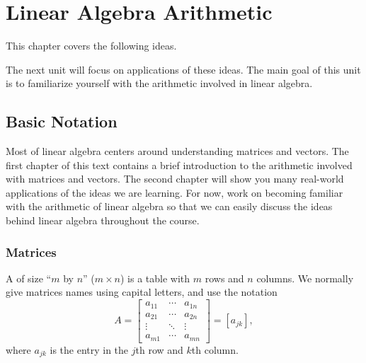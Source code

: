 
\chapter{Linear Algebra Arithmetic}

This chapter covers the following ideas. 



The next unit will focus on applications of these ideas. The main goal of this unit is to familiarize yourself with the arithmetic involved in linear algebra.

\section{Basic Notation}
Most of linear algebra centers around understanding matrices and vectors. The first chapter of this text contains a brief introduction to the arithmetic involved with matrices and vectors.  The second chapter will show you many real-world applications of the ideas we are learning.  For now, work on becoming familiar with the arithmetic of linear algebra so that we can easily discuss the ideas behind linear algebra throughout the course.


\subsection{Matrices}
A  of size ``{$m$} by {$n$}'' ($m\times n$) is a table
with {$m$} rows and {$n$} columns.  We normally give matrices names
using capital letters, and use the notation 
$$A = 
\begin{bmatrix}
a_{11}&\cdots&a_{1n}\\ 
a_{21}&\cdots&a_{2n}\\ 
\vdots&\ddots&\vdots\\ 
a_{m1}&\cdots&a_{mn} 
\end{bmatrix} 
= [a_{jk}],$$
where $a_{jk}$ is the entry in the $j$th row and $k$th column. 



